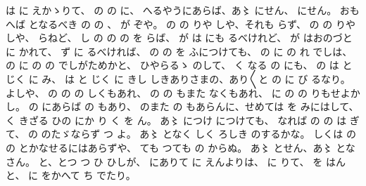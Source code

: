 は
に
えかゝりて、
の
の
に、
へるやうにあらば、あ〻
にせん、
にせん。
おもへば
となるべき
の
の
、
が
ぞや。
の
の
りや
しや、それも
らず、
の
の
りや
しや、
らねど、
し
の
の
の
を
らば、
が
は
にも
るべけれど、
が
はおのづと
に
かれて、
ず
に
るべければ、
の
の
を
ふにつけても、
の
に
の
れ
でしは、
の
に
の
の
でしがためかと、
ひやらるゝ
のして、
く
なる
の
にも、
の
は
と
じく
に
み、
は
と
じく
に
きし
しきありさまの、あり〳〵と
の
に
び
るなり。
よしや、
の
の
の
しくもあれ、
の
の
もまた
なくもあれ、
に
の
の
りもせよかし。
の
にあらば
の
もあり、
のまた
の
もあらんに、せめては
を
みにはして、
く
きざる
ひの
にか
り
く
を
ん。
あ〻
につけ
につけても、
なれば
の
の
は
ぎて、
の
のたゞならず
つ
よ。
あ〻
となく
しく
ろしき
のするかな。
しくは
の
の
とかなせるにはあらずや、
ても
つても
の
からぬ。
あ〻
とせん、あ〻
となさん。
と、とつ
つ
ひ
ひしが、
にありて
に
えんよりは、
に
りて、
を
はんと、
に
をかへて
ち
でたり。

